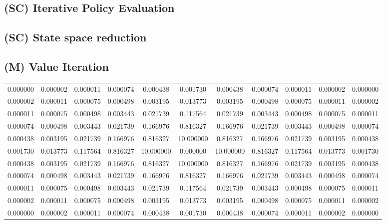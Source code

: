 \documentclass{article}
\begin{document}
\subsection{(SC) Iterative Policy Evaluation}

\subsection{(SC) State space reduction}

\subsection{(M) Value Iteration}

\begin{landscape}
\begin{tabular} {c c c c c c c c c c c}
0.000000 & 0.000002 & 0.000011 & 0.000074 & 0.000438 & 0.001730 & 0.000438 & 0.000074 & 0.000011 & 0.000002 & 0.000000\\
0.000002 & 0.000011 & 0.000075 & 0.000498 & 0.003195 & 0.013773 & 0.003195 & 0.000498 & 0.000075 & 0.000011 & 0.000002\\
0.000011 & 0.000075 & 0.000498 & 0.003443 & 0.021739 & 0.117564 & 0.021739 & 0.003443 & 0.000498 & 0.000075 & 0.000011\\
0.000074 & 0.000498 & 0.003443 & 0.021739 & 0.166976 & 0.816327 & 0.166976 & 0.021739 & 0.003443 & 0.000498 & 0.000074\\
0.000438 & 0.003195 & 0.021739 & 0.166976 & 0.816327 & 10.000000 & 0.816327 & 0.166976 & 0.021739 & 0.003195 & 0.000438\\
0.001730 & 0.013773 & 0.117564 & 0.816327 & 10.000000 & 0.000000 & 10.000000 & 0.816327 & 0.117564 & 0.013773 & 0.001730\\
0.000438 & 0.003195 & 0.021739 & 0.166976 & 0.816327 & 10.000000 & 0.816327 & 0.166976 & 0.021739 & 0.003195 & 0.000438\\
0.000074 & 0.000498 & 0.003443 & 0.021739 & 0.166976 & 0.816327 & 0.166976 & 0.021739 & 0.003443 & 0.000498 & 0.000074\\
0.000011 & 0.000075 & 0.000498 & 0.003443 & 0.021739 & 0.117564 & 0.021739 & 0.003443 & 0.000498 & 0.000075 & 0.000011\\
0.000002 & 0.000011 & 0.000075 & 0.000498 & 0.003195 & 0.013773 & 0.003195 & 0.000498 & 0.000075 & 0.000011 & 0.000002\\
0.000000 & 0.000002 & 0.000011 & 0.000074 & 0.000438 & 0.001730 & 0.000438 & 0.000074 & 0.000011 & 0.000002 & 0.000000\\
\end{tabular}

\end{landscape}
\end{document}
